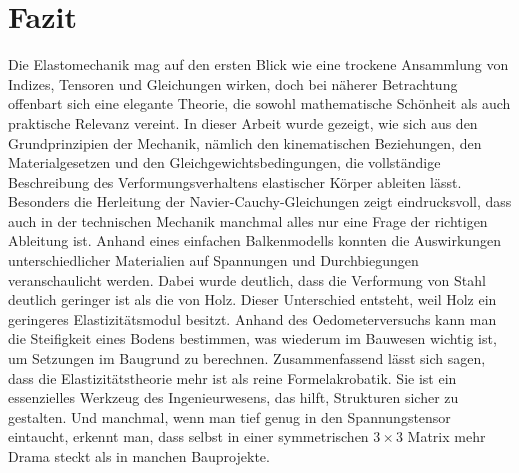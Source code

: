 %
%
%
%
\section*{Fazit
\label{elastomechanik:section:teil5}}
Die Elastomechanik mag auf den ersten Blick wie eine trockene Ansammlung von Indizes, Tensoren und Gleichungen wirken, doch bei näherer Betrachtung offenbart sich eine elegante Theorie, die sowohl mathematische Schönheit als auch praktische Relevanz vereint.
In dieser Arbeit wurde gezeigt, wie sich aus den Grundprinzipien der Mechanik, nämlich den kinematischen Beziehungen, den Materialgesetzen und den Gleichgewichtsbedingungen, die vollständige Beschreibung des Verformungsverhaltens elastischer Körper ableiten lässt. 
Besonders die Herleitung der Navier-Cauchy-Gleichungen zeigt eindrucksvoll, dass auch in der technischen Mechanik manchmal alles nur eine Frage der richtigen Ableitung ist.
Anhand eines einfachen Balkenmodells konnten die Auswirkungen unterschiedlicher Materialien auf Spannungen und Durchbiegungen veranschaulicht werden. 
Dabei wurde deutlich, dass die Verformung von Stahl deutlich geringer ist als die von Holz. 
Dieser Unterschied entsteht, weil Holz ein geringeres Elastizitätsmodul besitzt.
Anhand des Oedometerversuchs kann man die Steifigkeit eines Bodens bestimmen, was wiederum im Bauwesen wichtig ist, um Setzungen im Baugrund zu berechnen.
Zusammenfassend lässt sich sagen, dass die Elastizitätstheorie mehr ist als reine Formelakrobatik. 
Sie ist ein essenzielles Werkzeug des Ingenieurwesens, das hilft, Strukturen sicher zu gestalten. 
Und manchmal, wenn man tief genug in den Spannungstensor eintaucht, erkennt man, dass selbst in einer symmetrischen $3 \times 3$ Matrix mehr Drama steckt als in manchen Bauprojekte.


